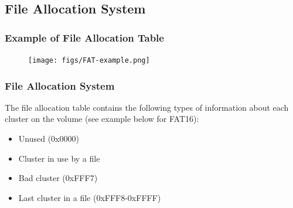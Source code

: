 % 
% 
% 
\subsection{File Allocation System} %
\begin{frame}[fragile]
    \frametitle{Example of File Allocation Table}
    \begin{figure}
  \texttt{[image: figs/FAT-example.png]}
  \end{figure}
\end{frame}
% 
% 
\begin{frame}[fragile]
    \frametitle{File Allocation System}
    The file allocation table contains the following {\color{red}types} of information about each cluster on the volume (see example below for FAT16):

    \begin{itemize}
        \item Unused (0x0000)
        \item Cluster in use by a file \pause
        \item Bad cluster (0xFFF7)
        \item Last cluster in a file (0xFFF8-0xFFFF)
    \end{itemize}
\end{frame}
